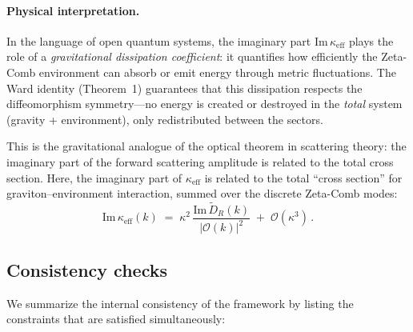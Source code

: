 \documentclass[12pt,a4paper]{article}
\begin{document}
\paragraph{Physical interpretation.}
In the language of open quantum systems, the imaginary part
$\mathrm{Im}\,\kappa_{\mathrm{eff}}$ plays the role of a
\emph{gravitational dissipation coefficient}: it quantifies how
efficiently the Zeta-Comb environment can absorb or emit energy
through metric fluctuations.  The Ward identity
(Theorem~1) guarantees that this dissipation respects the
diffeomorphism symmetry---no energy is created or destroyed in the
\emph{total} system (gravity + environment), only redistributed
between the sectors.

This is the gravitational analogue of the optical theorem in
scattering theory: the imaginary part of the forward scattering
amplitude is related to the total cross section.  Here, the imaginary
part of $\kappa_{\mathrm{eff}}$ is related to the total ``cross section''
for graviton--environment interaction, summed over the discrete
Zeta-Comb modes:
%
\begin{equation}
  \mathrm{Im}\,\kappa_{\mathrm{eff}}(k)
  \;=\;
  \kappa^2\,
  \frac{\mathrm{Im}\,\widetilde{D}_{\!R}(k)}{|\mathcal{O}(k)|^2}
  \;+\;
  \mathcal{O}(\kappa^3)\,.
  \label{eq:Imkappa_crosssection}
\end{equation}

\subsection{Consistency checks}
\label{subsec:checks}

We summarize the internal consistency of the framework by listing the
constraints that are satisfied simultaneously:
\end{document}
